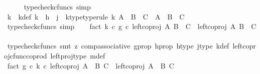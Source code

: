 \begin{isabellebody}
\ \ \ \ \isamarkupfalse%
\ {\isacharparenleft}{\kern0pt}typecheck{\isacharunderscore}{\kern0pt}cfuncs{\isacharcomma}{\kern0pt}\ simp{\isacharparenright}{\kern0pt}\isanewline
\ \ \isamarkupfalse%
\ k\ \ k{\isacharunderscore}{\kern0pt}def{\isacharcolon}{\kern0pt}\ {\isachardoublequoteopen}k\ {\isacharequal}{\kern0pt}\ h\ {\isasymamalg}\ j{\isachardoublequoteclose}\ \ k{\isacharunderscore}{\kern0pt}type{\isacharbrackleft}{\kern0pt}type{\isacharunderscore}{\kern0pt}rule{\isacharbrackright}{\kern0pt}{\isacharcolon}{\kern0pt}\ {\isachardoublequoteopen}k{\isacharcolon}{\kern0pt}\ {\isacharparenleft}{\kern0pt}A\ {\isasymCoprod}\ B{\isacharparenright}{\kern0pt}\ {\isasymCoprod}\ C\ {\isasymrightarrow}\ A\ {\isasymCoprod}\ {\isacharparenleft}{\kern0pt}B\ {\isasymCoprod}\ C{\isacharparenright}{\kern0pt}{\isachardoublequoteclose}\isanewline
\ \ \ \ \isamarkupfalse%
\ {\isacharparenleft}{\kern0pt}typecheck{\isacharunderscore}{\kern0pt}cfuncs{\isacharcomma}{\kern0pt}\ simp{\isacharparenright}{\kern0pt}\isanewline
\isanewline
\ \ \isamarkupfalse%
\ fact{}{\isacharcolon}{\kern0pt}\ {\isachardoublequoteopen}{\isacharparenleft}{\kern0pt}k\ {\isasymcirc}\isactrlsub c\ g{\isacharparenright}{\kern0pt}\ {\isasymcirc}\isactrlsub c\ {\isacharparenleft}{\kern0pt}left{\isacharunderscore}{\kern0pt}coproj\ A\ {\isacharparenleft}{\kern0pt}B\ {\isasymCoprod}\ C{\isacharparenright}{\kern0pt}{\isacharparenright}{\kern0pt}\ {\isacharequal}{\kern0pt}\ {\isacharparenleft}{\kern0pt}left{\isacharunderscore}{\kern0pt}coproj\ A\ {\isacharparenleft}{\kern0pt}B\ {\isasymCoprod}\ C{\isacharparenright}{\kern0pt}{\isacharparenright}{\kern0pt}{\isachardoublequoteclose}\isanewline
\ \ \ \ \isamarkupfalse%
\ {\isacharparenleft}{\kern0pt}typecheck{\isacharunderscore}{\kern0pt}cfuncs{\isacharcomma}{\kern0pt}\ smt\ {\isacharparenleft}{\kern0pt}z{}{\isacharparenright}{\kern0pt}\ comp{\isacharunderscore}{\kern0pt}associative{}\ g{\isacharunderscore}{\kern0pt}prop\ h{\isacharunderscore}{\kern0pt}prop{}\ h{\isacharunderscore}{\kern0pt}type\ j{\isacharunderscore}{\kern0pt}type\ k{\isacharunderscore}{\kern0pt}def\ left{\isacharunderscore}{\kern0pt}coproj{\isacharunderscore}{\kern0pt}cfunc{\isacharunderscore}{\kern0pt}coprod\ left{\isacharunderscore}{\kern0pt}proj{\isacharunderscore}{\kern0pt}type\ m{\isacharunderscore}{\kern0pt}def{\isacharparenright}{\kern0pt}\isanewline
\ \ \isamarkupfalse%
\ fact{}{\isacharcolon}{\kern0pt}\ {\isachardoublequoteopen}{\isacharparenleft}{\kern0pt}g\ {\isasymcirc}\isactrlsub c\ k{\isacharparenright}{\kern0pt}\ {\isasymcirc}\isactrlsub c\ {\isacharparenleft}{\kern0pt}left{\isacharunderscore}{\kern0pt}coproj\ {\isacharparenleft}{\kern0pt}A\ {\isasymCoprod}\ B{\isacharparenright}{\kern0pt}\ C{\isacharparenright}{\kern0pt}\ {\isacharequal}{\kern0pt}\ {\isacharparenleft}{\kern0pt}left{\isacharunderscore}{\kern0pt}coproj\ {\isacharparenleft}{\kern0pt}A\ {\isasymCoprod}\ B{\isacharparenright}{\kern0pt}\ C{\isacharparenright}{\kern0pt}{\isachardoublequoteclose}\isanewline

\end{isabellebody}
